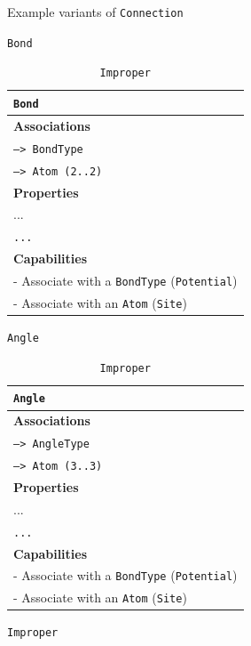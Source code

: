 \documentclass[12pt]{article}
\begin{document}
\begin{table}[ht]
    \centering
    \caption{Example variants of \texttt{Connection}}
    \label{tab:ExampleConnections}
    \begin{subtable}[h]{0.45\textwidth}
    \caption{\texttt{Bond}}
    \begin{tabular}{|l|}
         \hline
         \rowcolor{gray!50}
         \texttt{Bond}  \\
         \hline
         \textbf{Associations} \\
         \hline
         \texttt{--> BondType}\\
          \texttt{--> Atom (2..2)}\\

         \textbf{Properties}\\
         \hline
            ...\\
         \texttt{...}\\
         \hline
         \textbf{Capabilities}\\
         \hline
         - Associate with a \texttt{BondType} (\texttt{Potential})\\
         - Associate with an \texttt{Atom} (\texttt{Site})\\
        \hline
    \end{tabular}
    \end{subtable}
    \hfill
    \begin{subtable}[h]{0.45\textwidth}
       \caption{\texttt{Angle}}
    \begin{tabular}{|l|}
         \hline
         \rowcolor{gray!50}
         \texttt{Angle}  \\
         \hline
         \textbf{Associations} \\
         \hline
         \texttt{--> AngleType}\\
          \texttt{--> Atom (3..3)}\\

         \textbf{Properties}\\
         \hline
            ...\\
         \texttt{...}\\
         \hline
         \textbf{Capabilities}\\
         \hline
         - Associate with a \texttt{BondType} (\texttt{Potential})\\
         - Associate with an \texttt{Atom} (\texttt{Site})\\
        \hline
    \end{tabular}
    \end{subtable}
    \newline
    \vspace*{1 cm}
    \newline
    \begin{subtable}[h]{0.45\textwidth}
    \caption{\texttt{Improper}}
    \begin{tabular}{|l|}


\end{tabular}
\end{subtable}
\end{table}
\end{document}
